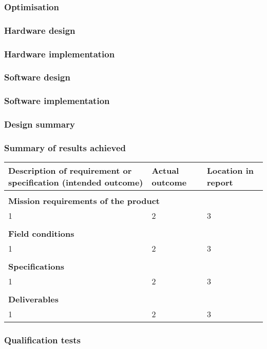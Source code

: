 \subsubsection{Optimisation}

\subsubsection{Hardware design}

\subsubsection{Hardware implementation}

\subsubsection{Software design}

\subsubsection{Software implementation}

\subsubsection{Design summary}



\subsubsection{Summary of results achieved}

\begin{tabular}{|p{5cm}|p{5cm}|p{5cm}|}
\hline
\textbf{Description of requirement or 
specification
(intended outcome)} & \textbf{Actual outcome}& \textbf{Location in report}\\
\hline
\multicolumn{3}{|l|}{}\\
\multicolumn{3}{|l|}{\textbf{Mission requirements of the product}}\\
\hline
1&2&3\\
\hline
\multicolumn{3}{|l|}{}\\
\multicolumn{3}{|l|}{\textbf{Field conditions}}\\
\hline
1&2&3\\
\hline
\multicolumn{3}{|l|}{}\\
\multicolumn{3}{|l|}{\textbf{Specifications}}\\
\hline
1&2&3\\
\hline
\multicolumn{3}{|l|}{}\\
\multicolumn{3}{|l|}{\textbf{Deliverables}}\\
\hline
1&2&3\\
\hline

\end{tabular}

\subsubsection{Qualification tests}